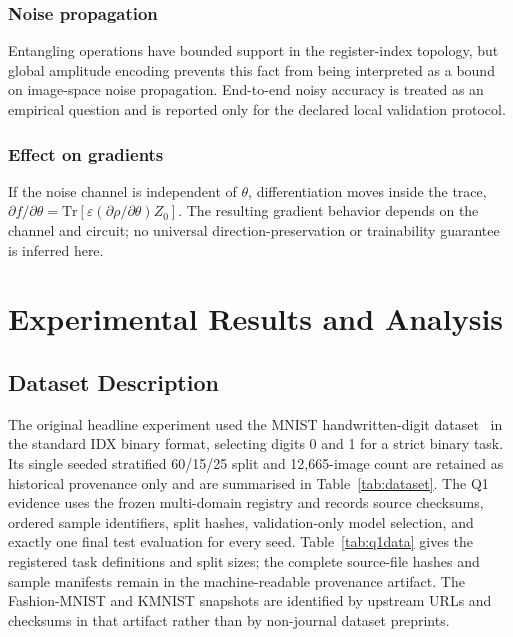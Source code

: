 \documentclass[conference]{IEEEtran}
\begin{document}
\subsubsection{Noise propagation}
Entangling operations have bounded support in the register-index topology, but global amplitude encoding prevents this fact from being interpreted as a bound on image-space noise propagation. End-to-end noisy accuracy is treated as an empirical question and is reported only for the declared local validation protocol.

\subsubsection{Effect on gradients}
If the noise channel is independent of $\theta$, differentiation moves inside the trace, $\partial f/\partial\theta = \text{Tr}[\varepsilon(\partial\rho/\partial\theta)Z_0]$. The resulting gradient behavior depends on the channel and circuit; no universal direction-preservation or trainability guarantee is inferred here.

\section{Experimental Results and Analysis}
\subsection{Dataset Description}
The original headline experiment used the MNIST handwritten-digit dataset~\cite{ref49} in the standard IDX binary format, selecting digits 0 and 1 for a strict binary task. Its single seeded stratified 60/15/25 split and 12,665-image count are retained as historical provenance only and are summarised in Table~\ref{tab:dataset}. The Q1 evidence uses the frozen multi-domain registry and records source checksums, ordered sample identifiers, split hashes, validation-only model selection, and exactly one final test evaluation for every seed. Table~\ref{tab:q1data} gives the registered task definitions and split sizes; the complete source-file hashes and sample manifests remain in the machine-readable provenance artifact. The Fashion-MNIST and KMNIST snapshots are identified by upstream URLs and checksums in that artifact rather than by non-journal dataset preprints.
\end{document}
